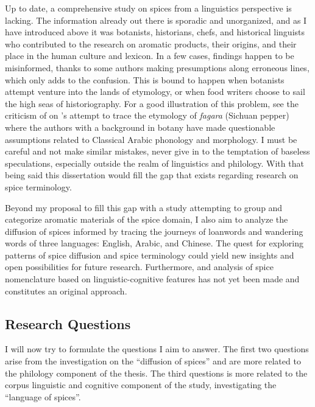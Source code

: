 Up to date, a comprehensive study on spices from a linguistics perspective is lacking. The information already out there is sporadic and unorganized, and as I have introduced above it was botanists, historians, chefs, and historical linguists who contributed to the research on aromatic products, their origins, and their place in the human culture and lexicon. In a few cases, findings happen to be misinformed, thanks to some authors making presumptions along erroneous lines, which only adds to the confusion. This is bound to happen when botanists attempt venture into the lands of etymology, or when food writers choose to sail the high seas of historiography. For a good illustration of this problem, see the criticism of \textcite{haw_cinnamon_2017} on \textcite{austin_sichuan_2008}'s attempt to trace the etymology of \textit{fagara} (Sichuan pepper) where the authors with a background in botany have made questionable assumptions related to Classical Arabic phonology and morphology. I must be careful and not make similar mistakes, never give in to the temptation of baseless speculations, especially outside the realm of linguistics and philology. With that being said this dissertation would fill the gap that exists regarding research on spice terminology.


Beyond my proposal to fill this gap with a study attempting to group and categorize aromatic materials of the spice domain, I also aim to analyze the diffusion of spices informed by tracing the journeys of loanwords and wandering words of three languages: English, Arabic, and Chinese. The quest for exploring patterns of spice diffusion and spice terminology could yield new insights and open possibilities for future research. Furthermore, and analysis of spice nomenclature based on linguistic-cognitive features has not yet been made and constitutes an original approach. 

\subsection{Research Questions}
\label{sec:research_questions}

I will now try to formulate the questions I aim to answer. The first two questions arise from the investigation on the ``diffusion of spices'' and are more related to the philology component of the thesis. The third questions is more related to the corpus linguistic and cognitive component of the study, investigating the ``language of spices''.

